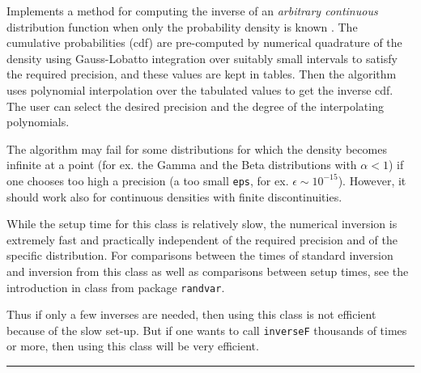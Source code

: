 
Implements a method for computing the  inverse of an \emph{arbitrary
continuous} distribution function when only the probability density
is known \cite{rDER09a}. The cumulative probabilities (cdf) are pre-computed by
 numerical quadrature  of the
density using Gauss-Lobatto integration over suitably small intervals to
satisfy the required precision, and these values are kept in tables. Then the
 algorithm uses polynomial interpolation  over the tabulated values to get
  the inverse cdf. The user can select the
  desired precision and the degree of the interpolating polynomials.

The algorithm may fail for some distributions for which the density
 becomes infinite at a point (for ex. the Gamma and the Beta distributions
 with $\alpha < 1$)  if one chooses too high a precision
(a  too small \texttt{eps}, for ex. $\epsilon \sim 10^{-15}$).
However, it should work also for continuous densities with finite discontinuities.


While the setup time for this class is relatively slow, the numerical inversion
 is extremely fast and practically independent of the required precision
and of the specific distribution. For comparisons between the times
of standard inversion and inversion from this class as well as 
comparisons between  setup times, see the introduction in class 
from package \texttt{randvar}.

Thus if only a few inverses are needed, then using this class
 is not efficient because of the slow set-up. But if one wants to call
 \texttt{inverseF} thousands of times or more, then using this class will 
be very efficient.

\bigskip\hrule


